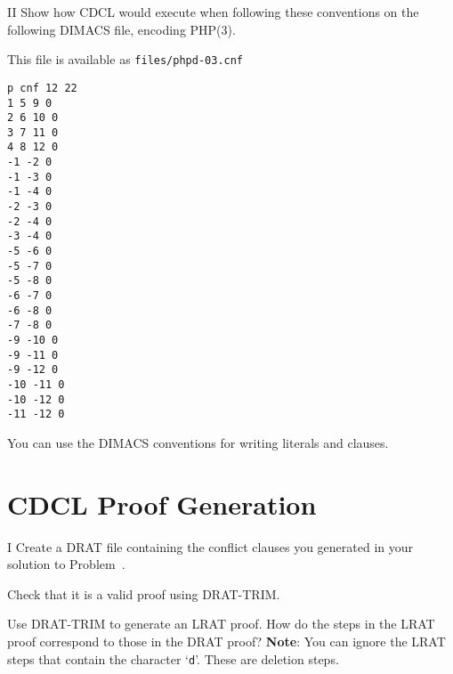 \begin{problem}{II}
  Show how CDCL would execute when following these conventions on the following
  DIMACS file, encoding PHP(3).

  This file is available as \texttt{files/phpd-03.cnf}
\begin{lstlisting}
p cnf 12 22
1 5 9 0
2 6 10 0
3 7 11 0
4 8 12 0
-1 -2 0
-1 -3 0
-1 -4 0
-2 -3 0
-2 -4 0
-3 -4 0
-5 -6 0
-5 -7 0
-5 -8 0
-6 -7 0
-6 -8 0
-7 -8 0
-9 -10 0
-9 -11 0
-9 -12 0
-10 -11 0
-10 -12 0
-11 -12 0
\end{lstlisting}
  You can use the DIMACS conventions for writing literals and clauses.
  
\end{problem}

\newpage

\section*{CDCL Proof Generation}


\begin{problem}{I}
Create a DRAT file containing the conflict clauses you generated in your solution to Problem~.
\begin{choice}
\item
Check that it is a valid proof using DRAT-TRIM.
\item
Use DRAT-TRIM to generate an LRAT proof.  How do the steps in the LRAT proof correspond to those in the DRAT proof?
{\bf Note}: You can ignore the LRAT steps that contain the character `\texttt{d}'.  These are deletion steps.
\end{choice}
\end{problem}

